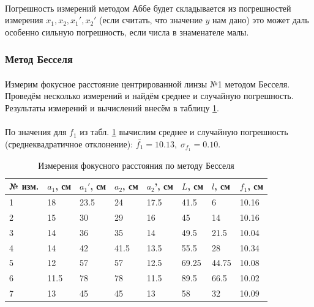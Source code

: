\documentclass[a4paper,12pt]{article} %
\begin{document}
\paragraph{} Погрешность измерений методом Аббе будет складывается из погрешностей измерения $x_1, x_2, x_1', x_2'$ (если считать, что значение $y$ нам дано) это может даль особенно сильную погрешность, если числа в знаменателе малы.

\subsubsection{Метод Бесселя}

\paragraph{} Измерим фокусное расстояние центрированной линзы №1 методом Бесселя. Проведём несколько измерений и найдём среднее и случайную погрешность. Результаты измерений и вычислений внесём в таблицу \ref{tab:bessel}.

\paragraph{} По значения для $f_1$ из табл. \ref{tab:bessel} вычислим среднее и случайную погрешность (среднеквадратичное отклонение): $\bar{f_1} = 10.13,\; \sigma_{f_1} = 0.10$.

\begin{table}[]
\centering
\begin{tabular}{|l|l|l|l|l|l|l|l|}
\hline
№ изм. & $a_1$, см & $a_1'$, см & $a_2$, см & $a_2$', см & $L$, см & $l$, см & $f_1$, см \\ \hline
1      & 18        & 23.5       & 24        & 17.5       & 41.5    & 6       & 10.16     \\ \hline
2      & 15        & 30         & 29        & 16         & 45      & 14      & 10.16     \\ \hline
3      & 14        & 36         & 35        & 14         & 49.5    & 21.5    & 10.04     \\ \hline
4      & 14        & 42         & 41.5      & 13.5       & 55.5    & 28      & 10.34     \\ \hline
5      & 12        & 57         & 57        & 12.5       & 69.25   & 44.75   & 10.08     \\ \hline
6      & 11.5      & 78         & 78        & 11.5       & 89.5    & 66.5    & 10.02     \\ \hline
7      & 13        & 45         & 45        & 13         & 58      & 32      & 10.09     \\ \hline
\end{tabular}
\caption{Измерения фокусного расстояния по методу Бесселя}
\label{tab:bessel}
\end{table}
\end{document}
